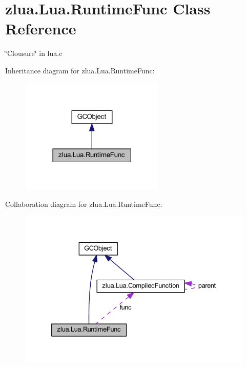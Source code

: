 \hypertarget{classzlua_1_1_lua_1_1_runtime_func}{}\section{zlua.\+Lua.\+Runtime\+Func Class Reference}
\label{classzlua_1_1_lua_1_1_runtime_func}


\char`\"{}\+Clousure\char`\"{} in lua.\+c  




Inheritance diagram for zlua.\+Lua.\+Runtime\+Func\+:
\nopagebreak
\begin{figure}[H]
\begin{center}
\leavevmode
\includegraphics[width=194pt]{classzlua_1_1_lua_1_1_runtime_func__inherit__graph}
\end{center}
\end{figure}


Collaboration diagram for zlua.\+Lua.\+Runtime\+Func\+:
\nopagebreak
\begin{figure}[H]
\begin{center}
\leavevmode
\includegraphics[width=332pt]{classzlua_1_1_lua_1_1_runtime_func__coll__graph}
\end{center}
\end{figure}
